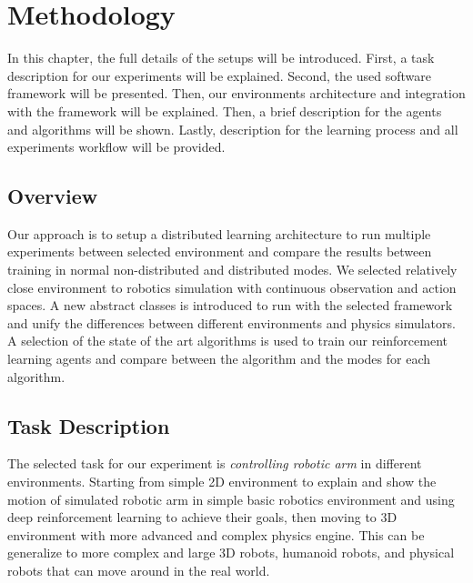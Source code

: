 
\chapter{Methodology}\label{chapter:methodology}

In this chapter, the full details of the setups will be introduced. First, a task description for our experiments will be explained. Second, the used software framework will be presented. Then, our environments architecture and integration with the framework will be explained. Then, a brief description for the agents and algorithms will be shown. Lastly, description for the learning process and all experiments workflow will be provided.

\section{Overview}

Our approach is to setup a distributed learning architecture to run multiple experiments between selected environment and compare the results between training in normal non-distributed and distributed modes. We selected relatively close environment to robotics simulation with continuous observation and action spaces. A new abstract classes is introduced to run with the selected framework and unify the differences between different environments and physics simulators. A selection of the state of the art algorithms is used to train our reinforcement learning agents and compare between the algorithm and the modes for each algorithm.

\section{Task Description}

The selected task for our experiment is \textit{controlling robotic arm} in different environments. Starting from simple 2D environment to explain and show the motion of simulated robotic arm in simple basic robotics environment and using deep reinforcement learning to achieve their goals, then moving to 3D environment with more advanced and complex physics engine. This can be generalize to more complex and large 3D robots, humanoid robots, and physical robots that can move around in the real world.

